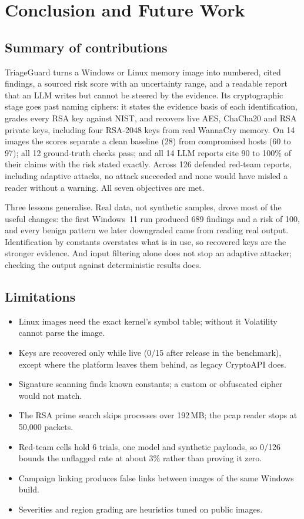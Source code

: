 \section{Conclusion and Future Work}
\label{sec:conclusion}

\subsection{Summary of contributions}
TriageGuard turns a Windows or Linux memory image into numbered, cited findings, a sourced risk score with an
uncertainty range, and a readable report that an LLM writes but cannot be steered by the evidence. Its
cryptographic stage goes past naming ciphers: it states the evidence basis of each identification, grades
every RSA key against NIST, and recovers live AES, ChaCha20 and RSA private keys, including four RSA-2048 keys
from real WannaCry memory. On 14 images the scores separate a clean baseline (28) from compromised hosts (60 to
97); all 12 ground-truth checks pass; and all 14 LLM reports cite 90 to 100\% of their claims with the risk stated
exactly. Across 126 defended red-team reports, including adaptive attacks, no attack succeeded and none would
have misled a reader without a warning. All seven objectives are met.

Three lessons generalise. Real data, not synthetic samples, drove most of the useful changes: the first
Windows~11 run produced 689 findings and a risk of 100, and every benign pattern we later downgraded came from
reading real output. Identification by constants overstates what is in use, so recovered keys are the stronger
evidence. And input filtering alone does not stop an adaptive attacker; checking the output against
deterministic results does.

\subsection{Limitations}
\begin{itemize}
  \item Linux images need the exact kernel's symbol table; without it Volatility cannot parse the image.
  \item Keys are recovered only while live (0/15 after release in the benchmark), except where the platform
        leaves them behind, as legacy CryptoAPI does.
  \item Signature scanning finds known constants; a custom or obfuscated cipher would not match.
  \item The RSA prime search skips processes over 192\,MB; the pcap reader stops at 50{,}000 packets.
  \item Red-team cells hold 6 trials, one model and synthetic payloads, so 0/126 bounds the unflagged rate at
        about 3\% rather than proving it zero.
  \item Campaign linking produces false links between images of the same Windows build.
  \item Severities and region grading are heuristics tuned on public images.
\end{itemize}

